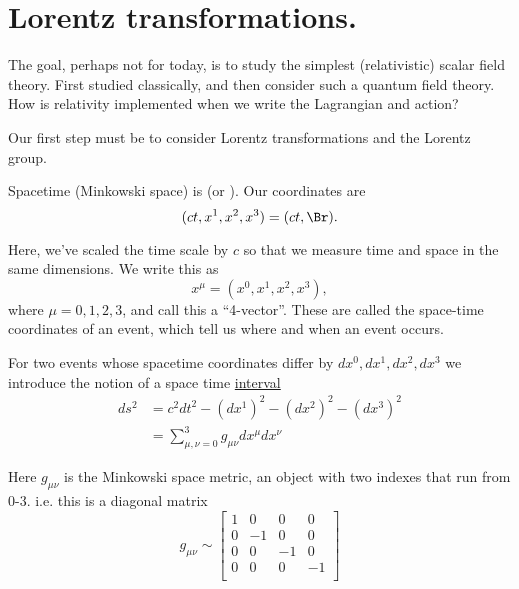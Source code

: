 %
%
\section{Lorentz transformations.}

The goal, perhaps not for today, is to study the simplest (relativistic) scalar field theory.  First studied classically, and then consider such a quantum field theory.
How is relativity implemented when we write the Lagrangian and action?

Our first step must be to consider Lorentz transformations and the Lorentz group.

Spacetime (Minkowski space) is  (or ).  Our coordinates are
\begin{equation}\label{eqn:qftLecture2:340}
(c t, x^1, x^2, x^3) = (c t, \Br).
\end{equation}

Here, we've scaled the time scale by \( c \) so that we measure time and space in the same dimensions.  We write this as
\begin{equation}\label{eqn:qftLecture2:360}
x^\mu = (x^0, x^1, x^2, x^3),
\end{equation}
%
where \( \mu = 0, 1, 2, 3 \), and call this a ``4-vector''.  These are called the space-time coordinates of an event, which tell us where and when an event occurs.

For two events whose spacetime coordinates differ by \( dx^0, dx^1, dx^2, dx^3 \) we introduce the notion of a space time \underline{interval}
\begin{equation}\label{eqn:qftLecture2:380}
\begin{aligned}
ds^2 
&= c^2 dt^2
- (dx^1)^2
- (dx^2)^2
- (dx^3)^2 \\
&=
\sum_{\mu, \nu = 0}^3 g_{\mu\nu} dx^\mu dx^\nu
\end{aligned}
\end{equation}

Here \( g_{\mu\nu} \) is the Minkowski space metric, an object with two indexes that run from 0-3.  i.e. this is a diagonal matrix
\begin{equation}\label{eqn:qftLecture2:400}
g_{\mu\nu} \sim
\begin{bmatrix}
1 & 0 & 0 & 0 \\
0 & -1 & 0 & 0 \\
0 & 0 & -1 & 0 \\
0 & 0 & 0 & -1 \\
\end{bmatrix}
\end{equation}

